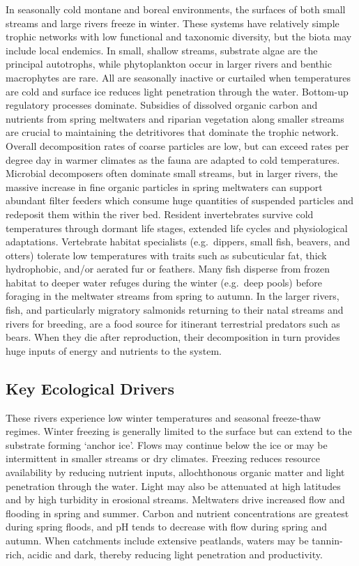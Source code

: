 \documentclass[
  letterpaper,
  DIV=11,
  numbers=noendperiod]{scrartcl}
\begin{document}
In seasonally cold montane and boreal environments, the surfaces of both
small streams and large rivers freeze in winter. These systems have
relatively simple trophic networks with low functional and taxonomic
diversity, but the biota may include local endemics. In small, shallow
streams, substrate algae are the principal autotrophs, while
phytoplankton occur in larger rivers and benthic macrophytes are rare.
All are seasonally inactive or curtailed when temperatures are cold and
surface ice reduces light penetration through the water. Bottom-up
regulatory processes dominate. Subsidies of dissolved organic carbon and
nutrients from spring meltwaters and riparian vegetation along smaller
streams are crucial to maintaining the detritivores that dominate the
trophic network. Overall decomposition rates of coarse particles are
low, but can exceed rates per degree day in warmer climates as the fauna
are adapted to cold temperatures. Microbial decomposers often dominate
small streams, but in larger rivers, the massive increase in fine
organic particles in spring meltwaters can support abundant filter
feeders which consume huge quantities of suspended particles and
redeposit them within the river bed. Resident invertebrates survive cold
temperatures through dormant life stages, extended life cycles and
physiological adaptations. Vertebrate habitat specialists (e.g.~dippers,
small fish, beavers, and otters) tolerate low temperatures with traits
such as subcuticular fat, thick hydrophobic, and/or aerated fur or
feathers. Many fish disperse from frozen habitat to deeper water refuges
during the winter (e.g.~deep pools) before foraging in the meltwater
streams from spring to autumn. In the larger rivers, fish, and
particularly migratory salmonids returning to their natal streams and
rivers for breeding, are a food source for itinerant terrestrial
predators such as bears. When they die after reproduction, their
decomposition in turn provides huge inputs of energy and nutrients to
the system.

\subsection{Key Ecological Drivers}\label{key-ecological-drivers-2}

These rivers experience low winter temperatures and seasonal freeze-thaw
regimes. Winter freezing is generally limited to the surface but can
extend to the substrate forming `anchor ice'. Flows may continue below
the ice or may be intermittent in smaller streams or dry climates.
Freezing reduces resource availability by reducing nutrient inputs,
allochthonous organic matter and light penetration through the water.
Light may also be attenuated at high latitudes and by high turbidity in
erosional streams. Meltwaters drive increased flow and flooding in
spring and summer. Carbon and nutrient concentrations are greatest
during spring floods, and pH tends to decrease with flow during spring
and autumn. When catchments include extensive peatlands, waters may be
tannin-rich, acidic and dark, thereby reducing light penetration and
productivity.
\end{document}
